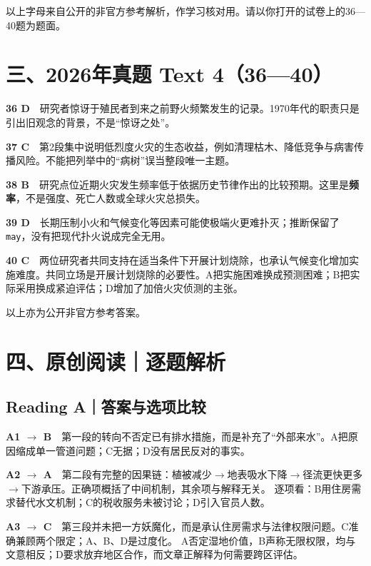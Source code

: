 \documentclass[a4paper,11pt,openany]{report}
\begin{document}
以上字母来自公开的非官方参考解析，作学习核对用。请以你打开的试卷上的36---40题为题面。

\section{三、2026年真题 Text 4（36---40）}\label{ux4e092026ux5e74ux771fux9898-text-43640}

\textbf{36 D}　研究者惊讶于殖民者到来之前野火频繁发生的记录。1970年代的职责只是引出旧观念的背景，不是``惊讶之处''。

\textbf{37 C}　第2段集中说明低烈度火灾的生态收益，例如清理枯木、降低竞争与病害传播风险。不能把列举中的``病树''误当整段唯一主题。

\textbf{38 B}　研究点位近期火灾发生频率低于依据历史节律作出的比较预期。这里是\textbf{频率}，不是强度、死亡人数或全球火灾总损失。

\textbf{39 D}　长期压制小火和气候变化等因素可能使极端火更难扑灭；推断保留了 \texttt{may}，没有把现代扑火说成完全无用。

\textbf{40 C}　两位研究者共同支持在适当条件下开展计划烧除，也承认气候变化增加实施难度。共同立场是开展计划烧除的必要性。A把实施困难换成预测困难；B把实际采用换成紧迫评估；D增加了加倍火灾侦测的主张。

以上亦为公开非官方参考答案。

\section{四、原创阅读｜逐题解析}\label{ux56dbux539fux521bux9605ux8bfbux9010ux9898ux89e3ux6790}

\subsection{Reading A｜答案与选项比较}\label{reading-aux7b54ux6848ux4e0eux9009ux9879ux6bd4ux8f83}

\textbf{A1 \(\rightarrow\) B}　第一段的转向不否定已有排水措施，而是补充了``外部来水''。A把原因缩成单一管道问题；C无据；D没有居民反对的事实。

\textbf{A2 \(\rightarrow\) A}　第二段有完整的因果链：植被减少\(\rightarrow\)地表吸水下降\(\rightarrow\)径流更快更多\(\rightarrow\)下游承压。正确项概括了中间机制，其余项与解释无关。 逐项看：B用住房需求替代水文机制；C的税收服务未被讨论；D引入官员人数。

\textbf{A3 \(\rightarrow\) C}　第三段并未把一方妖魔化，而是承认住房需求与法律权限问题。C准确兼顾两个限定；A、B、D是过度化。 A否定湿地价值，B声称无限权限，均与文意相反；D要求放弃地区合作，而文章正解释为何需要跨区评估。
\end{document}
